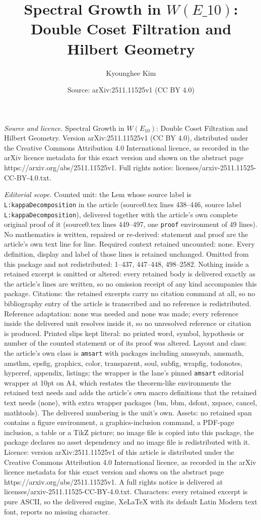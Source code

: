 \documentclass[10pt,a4paper]{amsart}
\title[Spectral Growth in $W(E\_{10})$: Double Coset Filtration and ]{Spectral Growth in $W(E\_{10})$: Double Coset Filtration and Hilbert Geometry}
\author{Kyounghee Kim}
\date{Source: arXiv:2511.11525v1 (CC BY 4.0)}
\begin{document}
\maketitle

\noindent\emph{Source and licence.} Spectral Growth in $W(E_{10})$: Double Coset Filtration and Hilbert Geometry. Version arXiv:2511.11525v1 (CC BY 4.0), distributed under the Creative Commons Attribution 4.0 International licence, as recorded in the arXiv licence metadata for this exact version and shown on the abstract page https://arxiv.org/abs/2511.11525v1. Full rights notice: licenses/arxiv-2511.11525-CC-BY-4.0.txt.\par\smallskip

\noindent\textit{Editorial scope.} Counted unit: the Lem whose source label is \texttt{L:kappaDecomposition} in the article (source0.tex lines 438--446, source label \texttt{L:kappaDecomposition}), delivered together with the article's own complete original proof of it (source0.tex lines 449--497, one \texttt{proof} environment of 49 lines). No mathematics is written, repaired or re-derived: statement and proof are the article's own text line for line. Required context retained uncounted: none. Every definition, display and label of those lines is retained unchanged. Omitted from this package and not redistributed: 1--437, 447--448, 498--2582. Nothing inside a retained excerpt is omitted or altered: every retained body is delivered exactly as the article's lines are written, so no omission receipt of any kind accompanies this package. Citations: the retained excerpts carry no citation command at all, so no bibliography entry of the article is transcribed and no reference is redistributed. Reference adaptation: none was needed and none was made; every reference inside the delivered unit resolves inside it, so no unresolved reference or citation is produced. Printed slips kept literal: no printed word, symbol, hypothesis or number of the counted statement or of its proof was altered. Layout and class: the article's own class is \texttt{amsart} with packages including amssymb, amsmath, amsthm, epsfig, graphicx, color, transparent, soul, subfig, wrapfig, todonotes, hyperref, appendix, listings; the wrapper is the lane's pinned \texttt{amsart} editorial wrapper at 10pt on A4, which restates the theorem-like environments the retained text needs and adds the article's own macro definitions that the retained text needs (none), with extra wrapper packages (bm, bbm, dsfont, xspace, cancel, mathtools). The delivered numbering is the unit's own. Assets: no retained span contains a figure environment, a graphics-inclusion command, a PDF-page inclusion, a table or a TikZ picture; no image file is copied into this package, the package declares no asset dependency and no image file is redistributed with it. Licence: version arXiv:2511.11525v1 of this article is distributed under the Creative Commons Attribution 4.0 International licence, as recorded in the arXiv licence metadata for this exact version and shown on the abstract page https://arxiv.org/abs/2511.11525v1. A full rights notice is delivered at licenses/arxiv-2511.11525-CC-BY-4.0.txt. Characters: every retained excerpt is pure ASCII, so the delivered engine, XeLaTeX with its default Latin Modern text font, reports no missing character.
\end{document}
